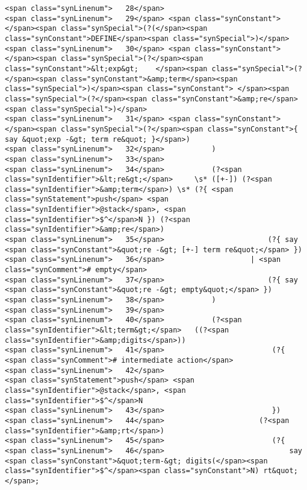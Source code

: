 \begin{verbatim}
<span class="synLinenum">   28</span> 
<span class="synLinenum">   29</span> <span class="synConstant">      </span><span class="synSpecial">(?(</span><span class="synConstant">DEFINE</span><span class="synSpecial">)</span>
<span class="synLinenum">   30</span> <span class="synConstant">          </span><span class="synSpecial">(?</span><span class="synConstant">&lt;exp&gt;    </span><span class="synSpecial">(?</span><span class="synConstant">&amp;term</span><span class="synSpecial">)</span><span class="synConstant"> </span><span class="synSpecial">(?</span><span class="synConstant">&amp;re</span><span class="synSpecial">)</span>
<span class="synLinenum">   31</span> <span class="synConstant">                       </span><span class="synSpecial">(?</span><span class="synConstant">{ say &quot;exp -&gt; term re&quot; }</span>)
<span class="synLinenum">   32</span>           )
<span class="synLinenum">   33</span> 
<span class="synLinenum">   34</span>           (?<span class="synIdentifier">&lt;re&gt;</span>     \s* ([+-]) (?<span class="synIdentifier">&amp;term</span>) \s* (?{ <span class="synStatement">push</span> <span class="synIdentifier">@stack</span>, <span class="synIdentifier">$^</span>N }) (?<span class="synIdentifier">&amp;re</span>)
<span class="synLinenum">   35</span>                        (?{ say <span class="synConstant">&quot;re -&gt; [+-] term re&quot;</span> })
<span class="synLinenum">   36</span>                    | <span class="synComment"># empty</span>
<span class="synLinenum">   37</span>                        (?{ say <span class="synConstant">&quot;re -&gt; empty&quot;</span> })
<span class="synLinenum">   38</span>           )
<span class="synLinenum">   39</span> 
<span class="synLinenum">   40</span>           (?<span class="synIdentifier">&lt;term&gt;</span>   ((?<span class="synIdentifier">&amp;digits</span>))
<span class="synLinenum">   41</span>                         (?{ <span class="synComment"># intermediate action</span>
<span class="synLinenum">   42</span>                             <span class="synStatement">push</span> <span class="synIdentifier">@stack</span>, <span class="synIdentifier">$^</span>N
<span class="synLinenum">   43</span>                         })
<span class="synLinenum">   44</span>                      (?<span class="synIdentifier">&amp;rt</span>)
<span class="synLinenum">   45</span>                         (?{
<span class="synLinenum">   46</span>                             say <span class="synConstant">&quot;term-&gt; digits(</span><span class="synIdentifier">$^</span><span class="synConstant">N) rt&quot;</span>;

\end{verbatim}
